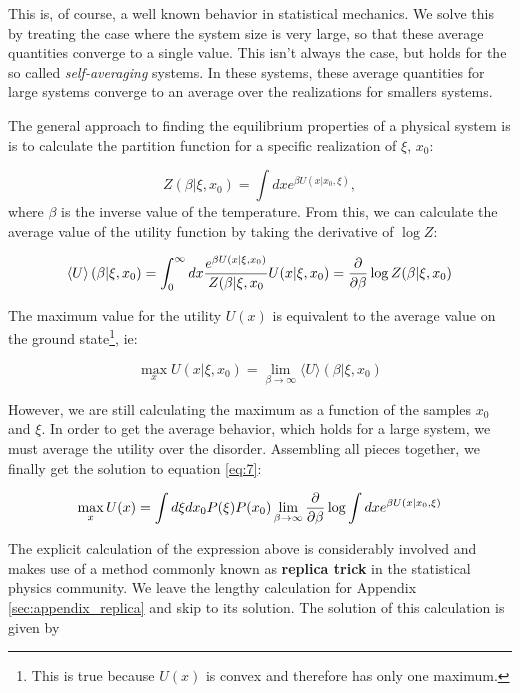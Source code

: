 This is, of course, a well known behavior in statistical mechanics. We
solve this by treating the case where the system size is very large,
so that these average quantities converge to a single value. This
isn't always the case, but holds for the so called
\emph{self-averaging} systems. In these systems, these average
quantities for large systems converge to an average over the
realizations for smallers systems.

The general approach to finding the equilibrium properties of a
physical system is is to calculate the partition function for a specific
realization of $\xi$, $x_0$:

\begin{equation}
  \label{eq:10}
  Z(\beta | \xi, x_0) = \int dx e^{\beta U(x| x_0, \xi)},
\end{equation}
where $\beta$ is the inverse value of the temperature. From this, we
can calculate the average value of the utility function by taking the
derivative of $\log Z$:

\begin{equation}
  \label{eq:12}
  \left \langle U \right \rangle (\beta | \xi, x_0) = \int_0^\infty dx
  \frac{e^{\beta U(x|\xi, x_0)}}{Z(\beta |\xi, x_0 } U(x|\xi, x_0) = \frac{\partial}{\partial \beta} \log Z(\beta | \xi, x_0)
\end{equation}

The maximum value for the utility $U(x)$ is equivalent to the average
value on the ground state\footnote{This is true because $U(x)$ is
  convex and therefore has only one maximum.}, ie:

\begin{equation}
  \label{eq:13}
  \max_x U(x | \xi, x_0) = \lim_{\beta\to\infty} \langle U \rangle (\beta | \xi, x_0)
\end{equation}

However, we are still calculating the maximum as a function of the
samples $x_0$ and $\xi$. In order to get the average behavior, which
holds for a large system, we must average the utility over the
disorder. Assembling all pieces together, we finally get the solution
to equation \eqref{eq:7}:

\begin{equation}
  \label{eq:14}
  \max_x U(x) = \int d\xi dx_0 P(\xi) P(x_0)  \lim_{\beta\to\infty} \frac{\partial}{\partial \beta} \log \int dx e^{\beta U(x| x_0, \xi)}
\end{equation}
 
The explicit calculation of the expression above is considerably
involved and makes use of a method commonly known as \textbf{replica
  trick} in the statistical physics community. We leave the lengthy calculation for Appendix \ref{sec:appendix_replica} and skip to its solution. The
solution of this calculation is given by

